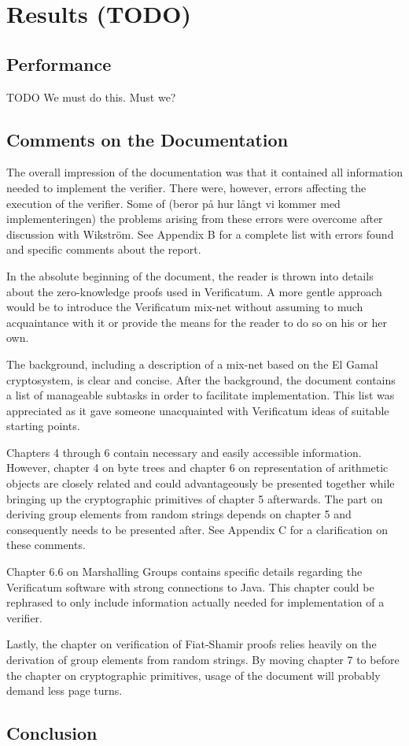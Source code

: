 \section{Results (TODO)}

\subsection{Performance}

TODO
We must do this. Must we?

\subsection{Comments on the Documentation}

The overall impression of the documentation was that it contained all
information needed to implement the verifier. There were, however,
errors affecting the execution of the verifier. Some of (beror på hur
långt vi kommer med implementeringen) the problems arising from these
errors were overcome after discussion with Wikström. See Appendix B
for a complete list with errors found and specific comments about the
report.

In the absolute beginning of the document, the reader is thrown into
details about the zero-knowledge proofs used in Verificatum. A more
gentle approach would be to introduce the Verificatum mix-net without
assuming to much acquaintance with it or provide the means for the
reader to do so on his or her own.

The background, including a description of a mix-net based on the El
Gamal cryptosystem, is clear and concise. After the background, the
document contains a list of manageable subtasks in order to facilitate
implementation. This list was appreciated as it gave someone
unacquainted with Verificatum ideas of suitable starting points.

Chapters 4 through 6 contain necessary and easily accessible
information. However, chapter 4 on byte trees and chapter 6 on
representation of arithmetic objects are closely related and could
advantageously be presented together while bringing up the
cryptographic primitives of chapter 5 afterwards. The part on deriving
group elements from random strings depends on chapter 5 and
consequently needs to be presented after. See Appendix C for a
clarification on these comments.

Chapter 6.6 on Marshalling Groups contains specific details regarding
the Verificatum software with strong connections to Java. This chapter
could be rephrased to only include information actually needed for
implementation of a verifier.

Lastly, the chapter on verification of Fiat-Shamir proofs relies
heavily on the derivation of group elements from random strings. By
moving chapter 7 to before the chapter on cryptographic primitives,
usage of the document will probably demand less page turns.

\subsection{Conclusion}

